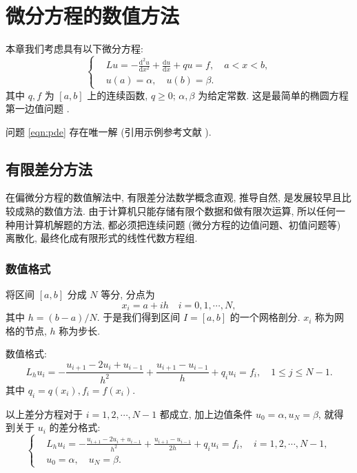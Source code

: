 \documentclass[master]{shnuthesis}
\begin{document}

\chapter{微分方程的数值方法}

本章我们考虑具有以下微分方程:
\begin{equation}\label{eqn:pde}
\left\{\begin{aligned}
& L u=-\frac{\mathrm{d}^{2} u}{\mathrm{d} x^{2}}+\frac{\mathrm{d} u}{\mathrm{d} x}+q u=f, \quad a < x < b, \\
& u(a)=\alpha, \quad u(b)=\beta.
\end{aligned}\right.
\end{equation}
其中 $q, f$ 为 $[a,b]$ 上的连续函数, $q \geqslant 0$; $\alpha, \beta$ 为给定常数. 这是最简单的椭圆方程第一边值问题 .

问题 \eqref{eqn:pde} 存在唯一解 (引用示例参考文献 \cite{LiLiu1997}).


\section{有限差分方法}
在偏微分方程的数值解法中, 有限差分法数学概念直观, 推导自然, 是发展较早且比较成熟的数值方法. 由于计算机只能存储有限个数据和做有限次运算, 所以任何一种用计算机解题的方法, 都必须把连续问题 (微分方程的边值问題、初值问题等) 离散化, 最终化成有限形式的线性代数方程组.

\subsection{数值格式}
将区间 $[a,b]$ 分成 $N$ 等分, 分点为
\begin{equation*}
  x_{i}=a+i h \quad i=0,1, \cdots, N,
\end{equation*}
其中 $h=(b-a) / N$. 于是我们得到区间 $I=[a,b]$ 的一个网格剖分. $x_i$ 称为网格的节点, $h$ 称为步长.

数值格式:
\begin{equation*}
  L_{h} u_{i}=-\frac{u_{i+1}-2 u_{i}+u_{i-1}}{h^{2}}+\frac{u_{i+1}-u_{i-1}}{h}+q_{i} u_{i}=f_{i},\quad 1 \leqslant j \leqslant N-1.
\end{equation*}
其中  $q_{i}=q(x_{i}), f_{i}=f(x_{i})$.

以上差分方程对于 $i=1,2, \cdots, N-1$ 都成立, 加上边值条件 $u_{0}=\alpha, u_{N}=\beta$, 就得到关于 $u_i$ 的差分格式:
\begin{equation}\label{eqn:fdm}
\left\{\begin{aligned}
& L_{h} u_{i}=-\frac{u_{i+1}-2 u_{i}+u_{i-1}}{h^{2}}+\frac{u_{i+1}-u_{i-1}}{2h}+q_{i} u_{i}=f_{i}, \quad i=1,2, \cdots, N-1, \\
& u_{0}=\alpha, \quad u_{N}=\beta.
\end{aligned}\right.
\end{equation}
\end{document}
